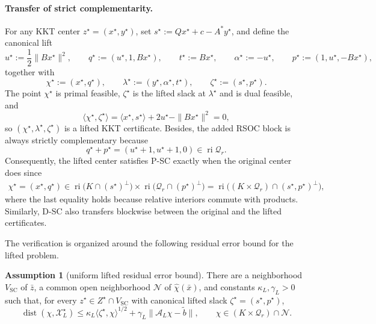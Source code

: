 \documentclass[letterpaper]{article} %
\theoremstyle{definition}
\newtheorem{assumption}[theorem]{Assumption}
\theoremstyle{remark}
\begin{document}
\paragraph{Transfer of strict complementarity.}
For any KKT center $z^\star=(x^\star,y^\star)$, 
set
$s^\star:=Qx^\star+c-A^*y^\star$, and define the canonical lift
\[
    u^\star:=\frac12\|Bx^\star\|^2,
    \qquad
    q^\star:=(u^\star,1,Bx^\star),
    \qquad
    t^\star:=Bx^\star,
    \qquad
    \alpha^\star:=-u^\star,
    \qquad
    p^\star:=(1,u^\star,-Bx^\star),
\]
together with
\[
    \chi^\star:=(x^\star,q^\star),\qquad
    \lambda^\star:=(y^\star,\alpha^\star,t^\star),\qquad
    \zeta^\star:=(s^\star,p^\star).
\]
The point $\chi^\star$ is primal feasible, $\zeta^\star$ is the lifted
slack at $\lambda^\star$ and is dual feasible, and
\[
    \langle\chi^\star,\zeta^\star\rangle
    =
    \langle x^\star,s^\star\rangle
    +2u^\star-\|Bx^\star\|^2
    =0,
\]
so $(\chi^\star,\lambda^\star,\zeta^\star)$ is a lifted KKT certificate. Besides, the added RSOC
block is always strictly complementary because
\[
    q^\star+p^\star
    =(u^\star+1,u^\star+1,0)
    \in\operatorname{ri}\mathcal Q_r.
\]
Consequently, the lifted center satisfies P-SC exactly when the original
center does since
\begin{align*}
    \chi^\star = (x^\star,q^\star)   \in \operatorname{ri}\bigl(K \cap(s^\star)^\perp\bigr) \times \operatorname{ri}\bigl(\mathcal Q_r \cap(p^\star)^\perp\bigr) = \operatorname{ri}\bigl((K\times\mathcal Q_r)\cap(s^\star,p^\star)^\perp\bigr),
\end{align*}
where the last equality holds because relative interiors commute with products. Similarly, D-SC also transfers
blockwise between the original and the lifted certificates.  

The verification is organized around the following residual error bound for
the lifted problem.

\begin{assumption}[uniform lifted residual error bound]
\label{ass:lifted-residual-eb}
There are a neighborhood $V_{\mathrm{SC}}$ of $\bar z$, a common open
neighborhood $\mathcal N$ of $\widehat\chi(\bar x)$, and constants
$\kappa_L,\gamma_L>0$ such that, for every
$z^\star\in Z^\star\cap V_{\mathrm{SC}}$ with canonical lifted slack
$\zeta^\star=(s^\star,p^\star)$,
\begin{equation}
\label{eq:lifted-residual-error-bound}
    \operatorname{dist}(\chi,\mathcal X_L^\star)
    \le
    \kappa_L\langle\zeta^\star,\chi\rangle^{1/2}
    +\gamma_L\|\mathcal A_L\chi-\widetilde b\|,
    \qquad
    \chi\in(K\times\mathcal Q_r)\cap\mathcal N.
\end{equation}
\end{assumption}
\end{document}
